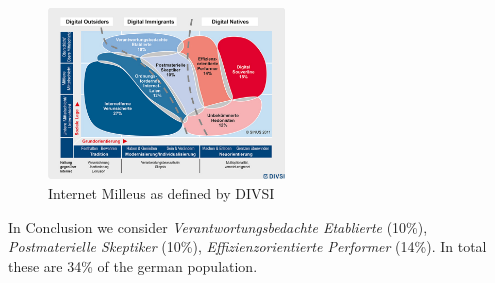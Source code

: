 \begin{figure}[hHtbp]
\centering
\includegraphics[width=0.56\textwidth]{graphix/DIVSI-Kartoffeln.jpg}
\caption{Internet Milleus as defined by DIVSI}
\label{fig:divsi_kartoffeln}
\end{figure}

In Conclusion we consider \textit{Verantwortungsbedachte Etablierte} (10\%),  \textit{Postmaterielle Skeptiker} (10\%),  \textit{Effizienzorientierte Performer} (14\%). In total these are 34\% of the german population.